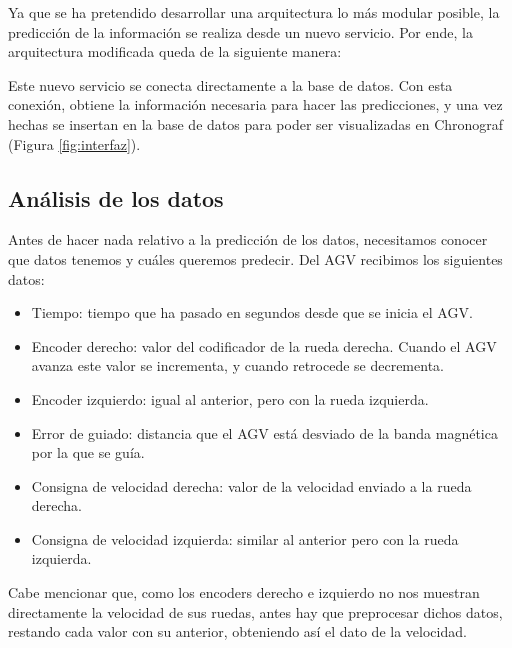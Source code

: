 Ya que se ha pretendido desarrollar una arquitectura lo más modular posible, la predicción de la 
información se realiza desde un nuevo servicio. Por ende, la arquitectura modificada queda de la 
siguiente manera:


Este nuevo servicio se conecta directamente a la base de datos. Con esta conexión, obtiene la 
información necesaria para hacer las predicciones, y una vez hechas se insertan en la base de datos 
para poder ser visualizadas en Chronograf (Figura \ref{fig:interfaz}).

\subsection{Análisis de los datos}

Antes de hacer nada relativo a la predicción de los datos, necesitamos conocer que datos tenemos y cuáles 
queremos predecir. Del AGV recibimos los siguientes datos:
\begin{itemize}
    \item Tiempo: tiempo que ha pasado en segundos desde que se inicia el AGV.
    \item Encoder derecho: valor del codificador de la rueda derecha. Cuando el AGV avanza este valor se
        incrementa, y cuando retrocede se decrementa.
    \item Encoder izquierdo: igual al anterior, pero con la rueda izquierda.
    \item Error de guiado: distancia que el AGV está desviado de la banda magnética por la que se guía.
    \item Consigna de velocidad derecha: valor de la velocidad enviado a la rueda derecha.
    \item Consigna de velocidad izquierda: similar al anterior pero con la rueda izquierda.
\end{itemize}

Cabe mencionar que, como los encoders derecho e izquierdo no nos muestran directamente la velocidad de sus 
ruedas, antes hay que preprocesar dichos datos, restando cada valor con su anterior, obteniendo así el dato de la 
velocidad.

